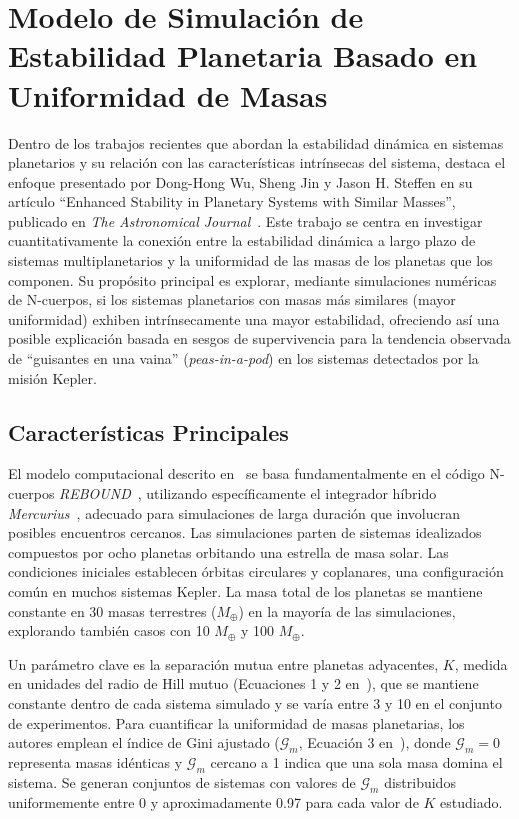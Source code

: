 
\section[Modelo de Estabilidad Planetaria]{Modelo de Simulación de Estabilidad Planetaria Basado en Uniformidad de Masas}%
\label{sec:state_of_the_art_10}

Dentro de los trabajos recientes que abordan la estabilidad dinámica en sistemas planetarios y su relación con las características intrínsecas del sistema, destaca el enfoque presentado por Dong-Hong Wu, Sheng Jin y Jason H. Steffen en su artículo ``Enhanced Stability in Planetary Systems with Similar Masses'', publicado en \textit{The Astronomical Journal}~\cite{Wu2025}. Este trabajo se centra en investigar cuantitativamente la conexión entre la estabilidad dinámica a largo plazo de sistemas multiplanetarios y la uniformidad de las masas de los planetas que los componen. Su propósito principal es explorar, mediante simulaciones numéricas de N-cuerpos, si los sistemas planetarios con masas más similares (mayor uniformidad) exhiben intrínsecamente una mayor estabilidad, ofreciendo así una posible explicación basada en sesgos de supervivencia para la tendencia observada de ``guisantes en una vaina'' (\textit{peas-in-a-pod}) en los sistemas detectados por la misión Kepler.

\subsection{Características Principales}
El modelo computacional descrito en~\cite{Wu2025} se basa fundamentalmente en el código N-cuerpos \textit{REBOUND}~\cite{Rein2012}, utilizando específicamente el integrador híbrido \textit{Mercurius}~\cite{rein2019}, adecuado para simulaciones de larga duración que involucran posibles encuentros cercanos. Las simulaciones parten de sistemas idealizados compuestos por ocho planetas orbitando una estrella de masa solar. Las condiciones iniciales establecen órbitas circulares y coplanares, una configuración común en muchos sistemas Kepler. La masa total de los planetas se mantiene constante en 30 masas terrestres ($M_\oplus$) en la mayoría de las simulaciones, explorando también casos con 10 $M_\oplus$ y 100 $M_\oplus$.

Un parámetro clave es la separación mutua entre planetas adyacentes, $K$, medida en unidades del radio de Hill mutuo (Ecuaciones 1 y 2 en~\cite{Wu2025}), que se mantiene constante dentro de cada sistema simulado y se varía entre 3 y 10 en el conjunto de experimentos. Para cuantificar la uniformidad de masas planetarias, los autores emplean el índice de Gini ajustado ($\mathcal{G}_m$, Ecuación 3 en~\cite{Wu2025}), donde $\mathcal{G}_m = 0$ representa masas idénticas y $\mathcal{G}_m$ cercano a 1 indica que una sola masa domina el sistema. Se generan conjuntos de sistemas con valores de $\mathcal{G}_m$ distribuidos uniformemente entre 0 y aproximadamente 0.97 para cada valor de $K$ estudiado.

